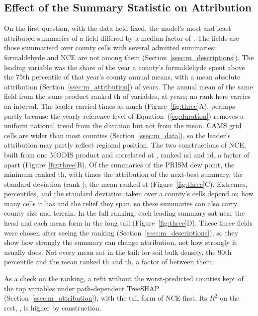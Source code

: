 \documentclass[sensors,article,submit,moreauthors,pdftex]{Definitions/mdpi}
\begin{document}
\subsection{Effect of the Summary Statistic on Attribution}
\label{ssec:r_two}
On the first question, with the data held fixed, the model's most and least attributed summaries of a
field differed by a median factor of \CensusMedianSpread{}. The
\StatFieldsTotal{} fields are those summarised over county cells with several admitted
summaries; formaldehyde and NCE are not among them
(Section~\ref{ssec:m_descriptions}). The leading variable
was the share of the year a county's formaldehyde spent above the 75th
percentile of that year's county annual means, with a mean absolute
attribution (Section~\ref{ssec:m_attribution}) of \HchoDurSHAP{} years. The annual mean of the same field from the same product
ranked \HchoConRank{}th of \Nfeatpruned{} variables, at \HchoConSHAP{} years; no rank here carries an interval.
The leader carried \HchoRatio{} times as much (Figure~\ref{fig:three}A), perhaps partly because the yearly reference level of Equation~(\ref{eq:duration}) removes a uniform national trend from the duration but not from the mean. CAMS grid cells are wider than most counties (Section~\ref{ssec:m_data}), so the leader's attribution may partly reflect regional position. The
two constructions of NCE,
built from one MODIS product and correlated at \NCEcorr{}, ranked
\NCEpctRank{}nd and \NCEmeanRank{}rd, a factor of \NCEratio{} apart
(Figure~\ref{fig:three}B). Of the \DPSummariesN{} summaries of the PRISM dew
point, the minimum ranked \DPMinRank{}th, with \DPProfileRatio{} times the
attribution of the next-best summary, the standard deviation (rank
\DPNextRank{}); the mean ranked \DPMeanRank{}st (Figure~\ref{fig:three}C). Extremes,
percentiles, and the standard deviation taken over a county's cells depend on
how many cells it has and the relief they span, so these summaries can also
carry county size and terrain. In the full ranking, each leading
summary sat near the head and each mean form in the long tail
(Figure~\ref{fig:three}D). These three fields were chosen after seeing the ranking
(Section~\ref{ssec:m_descriptions}), so they show how strongly the summary
can change attribution, not how strongly it usually does. Not every mean sat in the tail: for soil bulk
density, the 90th percentile and the mean
ranked \SoilPninetyRank{}th and \SoilMeanRank{}th, a factor of \SoilRatio{}
between them.

As a check on the ranking, a refit without the \InflDropN{} worst-predicted
counties kept \InflOverlap{} of the top \InflTopK{} variables under
path-dependent TreeSHAP (Section~\ref{ssec:m_attribution}), with the tail form of NCE first. Its $R^{2}$ on the
rest, \InflDropRtwo{}, is higher by construction.
\end{document}

